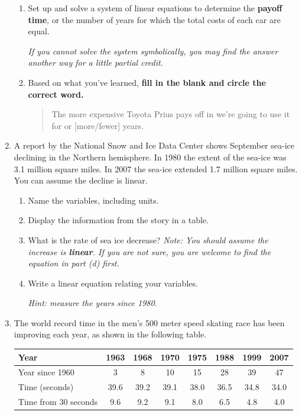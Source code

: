 \documentclass[12pt]{article}
\begin{document}
\begin{enumerate}
\begin{enumerate}
\item Set up and solve a system of linear equations to determine the \textbf{payoff time}, or the number of years for which the total costs of each car are equal.

\emph{If you cannot solve the system symbolically, you may find the answer another way for a little partial credit.}
\vfill

\item Based on what you've learned, \textbf{fill in the blank and circle the correct word.}

\begin{quote}
The more expensive Toyota Prius pays off in we're going to use it for \hrulefill   or [more/fewer] years.  
\end{quote}

\end{enumerate}
\newpage



\item A report by the National Snow and Ice Data Center shows September sea-ice declining in the Northern hemisphere. In 1980 the extent of the sea-ice was 3.1 million square miles.  In 2007 the sea-ice extended 1.7 million square miles.  You can assume the decline is linear.

\begin{enumerate}
\item Name the variables, including units.
\vfill
\item Display the information from the story in a table.
\vfill
\item What is the rate of sea ice decrease?  \emph{Note:  You should assume the increase is \textbf{linear}. If you are not sure, you are welcome to find the equation in part (d) first.}
\vfill
\item Write a linear equation relating your variables.

\emph{Hint:  measure the years since 1980.}
\vfill
\end{enumerate}
\newpage %
\item The world record time in the men's 500 meter speed skating race has been improving each year, as shown in the following table.

\begin{center}
\begin{tabular} {|l|c|c |c|c|c|c|c|}  \hline
Year & 1963 & 1968 & 1970 & 1975 & 1988 & 1999 & 2007  \\ \hline
Year since 1960 & 3 & 8 & 10 & 15 & 28 & 39 & 47  \\ \hline
Time (seconds) & 39.6 & 39.2 & 39.1 & 38.0 & 36.5 & 34.8 & 34.0  \\ \hline
Time from 30 seconds & 9.6 & 9.2 & 9.1 & 8.0 & 6.5 & 4.8 & 4.0  \\ \hline
\end{tabular}
\end{center}


\end{enumerate}
\end{document}
